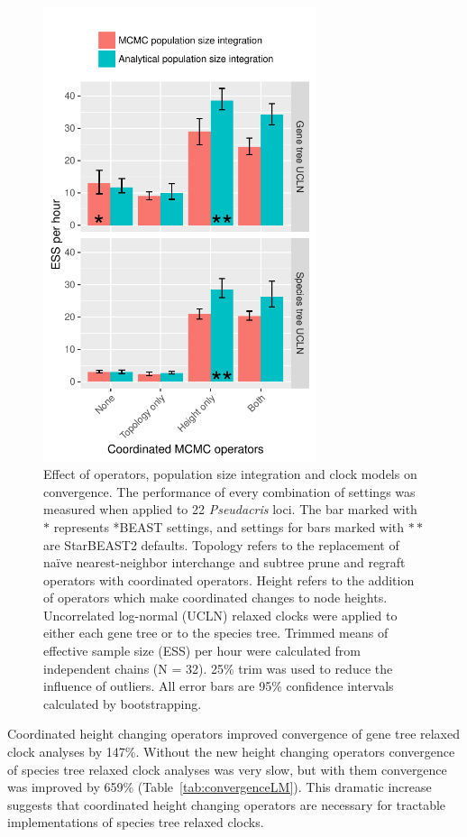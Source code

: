 \documentclass[12pt]{article}
\begin{document}
\begin{figure}[htb!]
\centering
\includegraphics[width=8cm]{minimum_ess_per_hour.pdf}
\caption
{Effect of operators, population size integration and clock models on
convergence. The performance of every combination of settings was measured when
applied to 22 \textit{Pseudacris} loci. The bar marked with $\ast$ represents
*BEAST settings, and settings for bars marked with $\ast\ast$ are StarBEAST2
defaults. Topology refers to the replacement of na\"ive nearest-neighbor
interchange and subtree prune and regraft operators with coordinated operators.
Height refers to the addition of operators which make coordinated changes to
node heights. Uncorrelated log-normal (UCLN) relaxed clocks were applied to
either each gene tree or to the species tree. Trimmed means of effective
sample size (ESS) per hour were calculated from independent chains (N = 32).
25\% trim was used to reduce the influence of outliers. All error bars are 95\%
confidence intervals calculated by bootstrapping.}
\label{fig:realEssPerHour}
\end{figure}

Coordinated height changing operators improved convergence of gene tree relaxed
clock analyses by 147\%. Without the new height changing operators convergence
of species tree relaxed clock analyses was very slow, but with them convergence
was improved by 659\% (Table~\ref{tab:convergenceLM}). This dramatic increase
suggests that coordinated height changing operators are necessary for tractable
implementations of species tree relaxed clocks.
\end{document}
